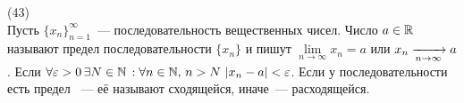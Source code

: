 (43)\\
Пусть $\{x_n\}^{\infty}_{n = 1}$~--- последовательность вещественных чисел. Число $a \in \mathbb{R}$ называют предел последовательности $\{x_n\}$ и пишут $\lim\limits_{n\to \infty} x_n = a$ или $x_n \xrightarrow[n \to \infty]{} a$. Если $\forall \varepsilon > 0 \, \exists N \in \mathbb{N}\,: \forall n \in \mathbb{N},\, n > N\ |x_n - a| < \varepsilon$. Если у последовательности есть предел ~--- её называют сходящейся, иначе~--- расходящейся.